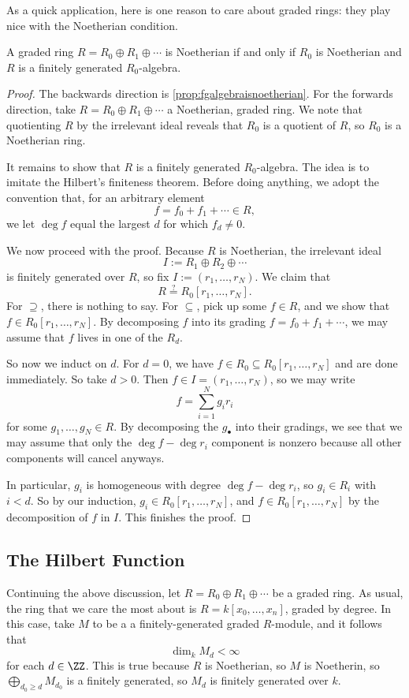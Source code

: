 As a quick application, here is one reason to care about graded rings: they play nice with the Noetherian condition.
\begin{proposition}
	A graded ring $R=R_0\oplus R_1\oplus\cdots$ is Noetherian if and only if $R_0$ is Noetherian and $R$ is a finitely generated $R_0$-algebra.
\end{proposition}
\begin{proof}
	The backwards direction is \autoref{prop:fgalgebraisnoetherian}. For the forwards direction, take $R=R_0\oplus R_1\oplus\cdots$ a Noetherian, graded ring. We note that quotienting $R$ by the irrelevant ideal reveals that $R_0$ is a quotient of $R$, so $R_0$ is a Noetherian ring.

	It remains to show that $R$ is a finitely generated $R_0$-algebra. The idea is to imitate the Hilbert's finiteness theorem. Before doing anything, we adopt the convention that, for an arbitrary element
	\[f=f_0+f_1+\cdots\in R,\]
	we let $\deg f$ equal the largest $d$ for which $f_d\ne0$.
	
	We now proceed with the proof. Because $R$ is Noetherian, the irrelevant ideal
	\[I:=R_1\oplus R_2\oplus\cdots\]
	is finitely generated over $R$, so fix $I:=(r_1,\ldots,r_N)$. We claim that
	\[R\stackrel?=R_0[r_1,\ldots,r_N].\]
	For $\supseteq$, there is nothing to say. For $\subseteq$, pick up some $f\in R$, and we show that $f\in R_0[r_1,\ldots,r_N]$. By decomposing $f$ into its grading $f=f_0+f_1+\cdots$, we may assume that $f$ lives in one of the $R_d$.

	So now we induct on $d$. For $d=0$, we have $f\in R_0\subseteq R_0[r_1,\ldots,r_N]$ and are done immediately. So take $d>0$. Then $f\in I=(r_1,\ldots,r_N)$, so we may write
	\[f=\sum_{i=1}^Ng_ir_i\]
	for some $g_1,\ldots,g_N\in R$. By decomposing the $g_\bullet$ into their gradings, we see that we may assume that only the $\deg f-\deg r_i$ component is nonzero because all other components will cancel anyways.
	
	In particular, $g_i$ is homogeneous with degree $\deg f-\deg r_i$, so $g_i\in R_i$ with $i<d$. So by our induction, $g_i\in R_0[r_1,\ldots,r_N]$, and $f\in R_0[r_1,\ldots,r_N]$ by the decomposition of $f$ in $I$. This finishes the proof.
\end{proof}

\subsection{The Hilbert Function}
Continuing the above discussion, let $R=R_0\oplus R_1\oplus\cdots$ be a graded ring. 
As usual, the ring that we care the most about is $R=k[x_0,\ldots,x_n]$, graded by degree. In this case, take $M$ to be a a finitely-generated graded $R$-module, and it follows that
\[\dim_kM_d<\infty\]
for each $d\in\ZZ$. This is true because $R$ is Noetherian, so $M$ is Noetherin, so $\bigoplus_{d_0\ge d}M_{d_0}$ is a finitely generated, so $M_d$ is finitely generated over $k$.

